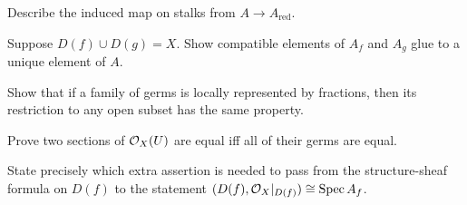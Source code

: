 \begin{exercise}\label{ex:vi17-22}
Describe the induced map on stalks from $A\to A_{\mathrm{red}}$.
\end{exercise}

\begin{exercise}\label{ex:vi17-23}
Suppose $D(f)\cup D(g)=X$.  Show compatible elements of $A_f$ and $A_g$ glue to a unique element of $A$.
\end{exercise}

\begin{exercise}\label{ex:vi17-24}
Show that if a family of germs is locally represented by fractions, then its restriction to any open subset has the same property.
\end{exercise}

\begin{exercise}\label{ex:vi17-25}
Prove two sections of $\mathcal O_X(U)$ are equal iff all of their germs are equal.
\end{exercise}

\begin{exercise}\label{ex:vi17-26}
State precisely which extra assertion is needed to pass from the structure-sheaf formula on $D(f)$ to the statement $(D(f),\mathcal O_X|_{D(f)})\cong\operatorname{Spec} A_f$.
\end{exercise}
